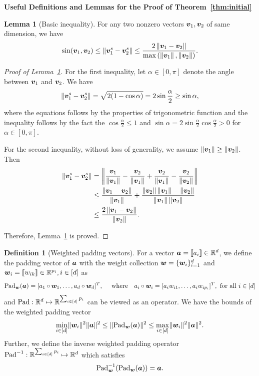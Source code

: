 \documentclass[lettersize,onecolumn,journal]{IEEEtran}
\theoremstyle{definition}
\newtheorem{lem}{Lemma}
\theoremstyle{definition}
\newtheorem{defn}{Definition}
\begin{document}
{\bf Useful Definitions and Lemmas for the Proof of Theorem~\ref{thm:initial}} 
\begin{lem}[Basic inequality]\label{lem:norm_diff} For any two nonzero vectors $\bm{v}_1,\bm{v}_2$ of same dimension, we have 
\[
\sin(\bm{v}_1 , \bm{v}_2) \leq \left\lVert{\bm{v}_1^s}-{\bm{v}_2^s}\right\rVert\leq {2\left\lVert\bm{v}_1-\bm{v}_2\right\rVert\over \max\left(\left\lVert\bm{v}_1\right\rVert,\left\lVert\bm{v}_2\right\rVert\right)}.
\]
\end{lem}
\begin{proof}[Proof of Lemma~\ref{lem:norm_diff}]
For the first inequality, let $\alpha \in [0,\pi]$ denote the angle between $\bm{v}_1$ and $\bm{v}_2$. We have 
\begin{align}
     \left\lVert{\bm{v}_1^s}-{\bm{v}_2^s}\right\rVert = \sqrt{2(1 - \cos \alpha)} = 2 \sin \frac{\alpha}{2} \geq \sin \alpha,
\end{align}
where the equations follows by the properties of trigonometric function and the inequality follows by the fact the $\cos \frac{\alpha}{2} \leq 1$ and $\sin \alpha = 2 \sin \frac{\alpha}{2} \cos \frac{\alpha}{2} > 0$ for $\alpha \in [0, \pi]$. 

For the second inequality, without loss of generality, we assume $\left\lVert\bm{v}_1\right\rVert\geq \left\lVert\bm{v}_2\right\rVert$. Then
\begin{align}
\left\lVert{\bm{v}_1^s}-{\bm{v}_2^s}\right\rVert&=\left\lVert{\bm{v}_1\over \left\lVert\bm{v}_1\right\rVert}- {\bm{v}_2\over \left\lVert\bm{v}_1\right\rVert}+{\bm{v}_2\over \left\lVert\bm{v}_1\right\rVert}-{\bm{v}_2\over \left\lVert\bm{v}_2\right\rVert}\right\rVert\\
&\leq {\left\lVert\bm{v}_1-\bm{v}_2\right\rVert\over \left\lVert\bm{v}_1\right\rVert}+{\left\lVert\bm{v}_2\right\rVert\left\lVert\bm{v}_1\right\rVert-\left\lVert\bm{v}_2\right\rVert\over \left\lVert\bm{v}_1\right\rVert\left\lVert\bm{v}_2\right\rVert}\\
&\leq {2\left\lVert\bm{v}_1-\bm{v}_2\right\rVert\over \left\lVert\bm{v}_2\right\rVert}.
\end{align}

Therefore, Lemma~\ref{lem:norm_diff} is proved.
\end{proof}


\begin{defn}[Weighted padding vectors]\label{def:pad} For a vector $\bm{a} = \llbracket a_i \rrbracket \in \mathbb{R}^d$, we define the padding vector of $\bm{a}$ with the weight collection $\bm{w} = \{\bm{w}_i\}_{i = 1}^d$ and $\bm{w}_i = \llbracket w_{ik} \rrbracket \in \mathbb{R}^{p_i}, i \in [d]$ as
\begin{equation}
    \text{Pad}_{\bm{w}}(\bm{a}) = [a_1 \circ \bm{w}_1, \ldots, a_d \circ \bm{w}_d]^T, \quad \text{ where} \quad  a_i \circ \bm{w}_i = [a_i w_{i1},\ldots, a_i w_{i p_i}]^T, \text{ for all } i \in [d]
\end{equation}
and $\text{Pad}: \mathbb{R}^{d}\mapsto \mathbb{R}^{\sum_{i\in[d]}p_i}$ can be viewed as an operator.
We have the bounds of the weighted padding vector
\begin{equation}\label{eq:pad_bound}
     \min_{i \in [d]} \onormSize{}{\mw_i}^2 \onormSize{}{\ma}^2 \leq \onormSize{}{\pad_{\mw}(\ma)}^2 \leq \max_{i \in [d]} \onormSize{}{\mw_i}^2 \onormSize{}{\ma}^2.
\end{equation}
Further, we define the inverse weighted padding operator $\text{Pad}^{-1}: \mathbb{R}^{\sum_{i\in[d]}p_i}\mapsto \mathbb{R}^d$ which satisfies 
\begin{equation}
    \text{Pad}^{-1}_{\bm{w}}(\text{Pad}_{\bm{w}}(\bm{a})) = \bm{a}.
\end{equation}
\end{defn}
\end{document}
